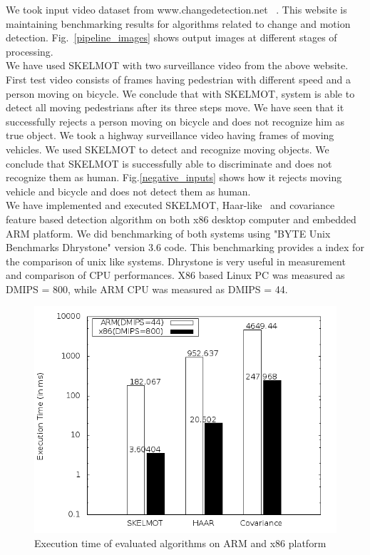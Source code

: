 \indent We took input video dataset from www.changedetection.net
~\cite{36}. This website is maintaining benchmarking results for
algorithms related to change and motion detection. Fig.~\ref{pipeline_images} shows
output images at different stages of processing.\\
\indent We have used SKELMOT with two surveillance video from the above
website. First test video consists of frames having pedestrian with
different speed and a person moving on bicycle. We conclude that with
SKELMOT, system is able to detect all moving pedestrians after its three
steps move. We have seen that it successfully rejects a person moving on
bicycle and does not recognize him as true object. We took a highway
surveillance video having frames of moving vehicles. We used SKELMOT to
detect and recognize moving objects. We conclude that SKELMOT is
successfully able to discriminate and does not recognize them as human.
Fig.\ref{negative_inputs} shows how it rejects moving vehicle and
bicycle and does not detect them as human.\\
\indent We have implemented and executed SKELMOT, Haar-like~\cite{19} and
covariance~\cite{19} feature based detection algorithm on both x86
desktop computer and embedded ARM platform. We did benchmarking of both
systems using "BYTE Unix Benchmarks Dhrystone" version 3.6 code. This benchmarking
provides a index for the comparison of unix like systems. Dhrystone is
very useful in measurement and comparison of CPU performances. X86 based
Linux PC was measured as DMIPS = 800, while ARM CPU was measured as
DMIPS = 44.\\
\begin{figure}[!b]
\centering
\includegraphics[scale=0.60]{Figures/pipeline_execution_time}
\caption{Execution time of evaluated algorithms on ARM and x86
platform}
\label{pipeline_execution_time}
\end{figure}
